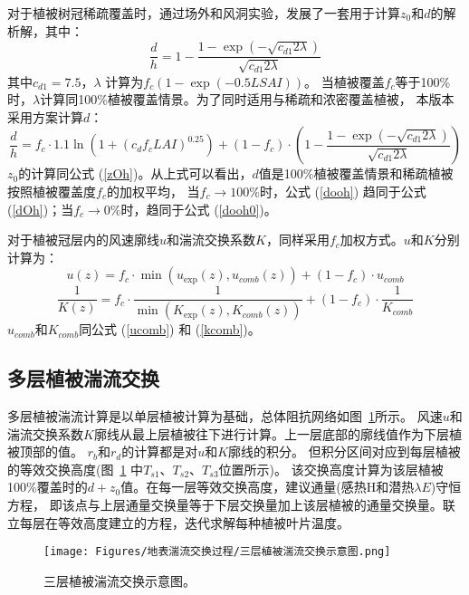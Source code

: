 对于植被树冠稀疏覆盖时，\citet{raupach1992drag,raupach1994simplified}通过场外和风洞实验，发展了一套用于计算$z_0$和$d$的解析解，其中：
\begin{equation}\label{dooh0}
\frac{d}{h}=1-\frac{1-\exp \left(-\sqrt{c_{d1} 2 \lambda}\right)}{\sqrt{c_{d1} 2 \lambda}}
\end{equation}
其中$c_{d1}=7.5$，$\lambda$%
计算为$f_c\left(1-\exp{\left(-0.5LSAI\right)}\right)$。
当植被覆盖$f_c$等于100\%时，$\lambda$计算同100\%植被覆盖情景。为了同时适用与稀疏和浓密覆盖植被，
本版本采用\citet{dai2019different}方案计算$d$：
\begin{equation}\label{dooh}
\frac{d}{h}=f_{c} \cdot 1.1 \ln \left(1+\left(c_{d} f_{c} LAI\right)^{0.25}\right)+\left(1-f_{c}\right) \cdot\left(1-\frac{1-\exp \left(-\sqrt{c_{d1} 2 \lambda}\right)}{\sqrt{c_{d1} 2 \lambda}}\right)
\end{equation}
$z_0$的计算同公式 (\ref{zOh})。从上式可以看出，$d$值是100\%植被覆盖情景和稀疏植被按照植被覆盖度$f_c$的加权平均，
当$f_c\rightarrow100\%$时，公式 (\ref{dooh}) 趋同于公式 (\ref{dOh})；当$f_c\rightarrow0\%$时，趋同于公式 (\ref{dooh0})。


对于植被冠层内的风速廓线$u$和湍流交换系数$K$，同样采用$f_c$加权方式。$u$和$K$分别计算为：
\begin{equation}
u(z)=f_{c} \cdot \min \left(u_{\exp }(z), u_{comb}(z)\right)+\left(1-f_{c}\right) \cdot u_{comb}
\end{equation}
\begin{equation}
\frac{1}{K(z)}=f_{c} \cdot \frac{1}{\min \left(K_{\exp}(z), K_{comb}(z)\right)}+\left(1-f_{c}\right) \cdot \frac{1}{K_{comb}}
\end{equation}
$u_{comb}$和$K_{comb}$同公式 (\ref{ucomb}) 和 (\ref{kcomb})。


\subsection{多层植被湍流交换}
多层植被湍流计算是以单层植被计算为基础，总体阻抗网络如图~\ref{fig:三层植被湍流交换示意图}所示。
风速$u$和湍流交换系数$K$廓线从最上层植被往下进行计算。上一层底部的廓线值作为下层植被顶部的值。
$r_b$和$r_d$的计算都是对$u$和$K$廓线的积分。
但积分区间对应到每层植被的等效交换高度(图~\ref{fig:三层植被湍流交换示意图} 中$T_{s1}$、$T_{s2}$、$T_{s3}$位置所示)。
该交换高度计算为该层植被100\%覆盖时的$d+z_0$值。在每一层等效交换高度，建议通量(感热H和潜热$\lambda E$)守恒方程，
即该点与上层通量交换量等于下层交换量加上该层植被的通量交换量。联立每层在等效高度建立的方程，迭代求解每种植被叶片温度。
{
\begin{figure}[]
\centering
\texttt{[image: Figures/地表湍流交换过程/三层植被湍流交换示意图.png]}
\caption{三层植被湍流交换示意图。}
\label{fig:三层植被湍流交换示意图}
\end{figure}
}


